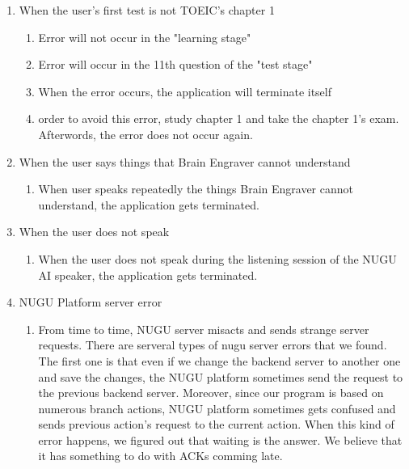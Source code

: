 \documentclass[conference]{IEEEtran}
\begin{document}
        \begin{enumerate}
            \item When the user's first test is not TOEIC's chapter 1
            \begin{enumerate}
                \item Error will not occur in the "learning stage"
                \item Error will occur in the 11th question of the "test stage"
                \item When the error occurs, the application will terminate itself
                \item order to avoid this error, study chapter 1 and take the chapter 1's exam. Afterwords, the error does not occur again.
            \end{enumerate}
            \item When the user says things that Brain Engraver cannot understand
            \begin{enumerate}
                \item When user speaks repeatedly the things Brain Engraver cannot understand, the application gets terminated.
            \end{enumerate}
            \item When the user does not speak
            \begin{enumerate}
                \item When the user does not speak during the listening session of the NUGU AI speaker, the application gets terminated.
            \end{enumerate}
            \item NUGU Platform server error
            \begin{enumerate}
                \item From time to time, NUGU server misacts and sends strange server requests. There are serveral types of nugu server errors that we found. The first one is that even if we change the backend server to another one and save the changes, the NUGU platform sometimes send the request to the previous backend server. Moreover, since our program is based on numerous branch actions, NUGU platform sometimes gets confused and sends previous action's request to the current action. When this kind of error happens, we figured out that waiting is the answer. We believe that it has something to do with ACKs comming late.
            \end{enumerate}
    \end{enumerate}
\end{document}
